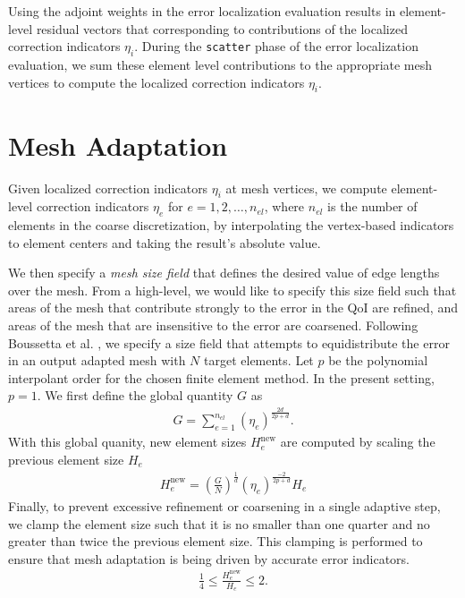 Using the adjoint weights in the error localization evaluation results in
element-level residual vectors that corresponding to contributions of the
localized correction indicators $\eta_i$.
During the \texttt{scatter} phase of the error localization evaluation, we
sum these element level contributions to the appropriate mesh vertices
to compute the localized correction indicators $\eta_i$.

\section{Mesh Adaptation}

Given localized correction indicators $\eta_i$ at mesh
vertices, we compute element-level correction indicators $\eta_e$ for
$e = 1,2,\dots, n_{el}$, where $n_{el}$ is the number of elements in the
coarse discretization, by interpolating the vertex-based indicators to
element centers and taking the result's absolute value.

We then specify a \emph{mesh size field} that defines the desired value
of edge lengths over the mesh. From a high-level, we would like to specify
this size field such that areas of the mesh that contribute strongly to
the error in the QoI are refined, and areas of the mesh that are
insensitive to the error are coarsened. Following Boussetta et al.
\cite{boussetta2006adaptive}, we specify a size field that attempts to
equidistribute the error in an output adapted mesh with $N$ target
elements. Let $p$ be the polynomial interpolant order for the chosen
finite element method. In the present setting, $p=1$. We first define
the global quantity $G$ as
%
\begin{gather}
G = \sum_{e=1}^{n_{el}} ( \eta_e ) ^{\frac{2d}{2p+d}}.
\label{eq:aut_global_size_quantity}
\end{gather}
%
With this global quanity, new element sizes $H_e^{\text{new}}$ are
computed by scaling the previous element size $H_e$
%
\begin{gather}
H_e^{\text{new}} = \left( \frac{G}{N} \right)^{\frac{1}{d}}
( \eta_e )^{\frac{-2}{2p + d}} H_e
\label{eq:aut_size_field}
\end{gather}
%
Finally, to prevent excessive refinement or coarsening in a single
adaptive step, we clamp the element size such that it is no
smaller than one quarter and no greater than twice the previous
element size. This clamping is performed to ensure that mesh adaptation
is being driven by accurate error indicators.
%
\begin{gather}
\frac14 \leq \frac{H_e^{\text{new}}}{H_e} \leq 2.
\label{eq:aut_size_clamping}
\end{gather}

